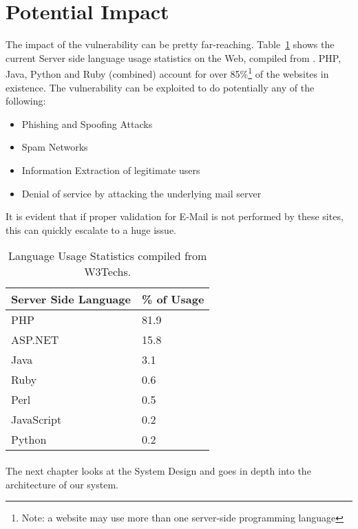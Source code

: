 \section{Potential Impact}

The impact of the vulnerability can be pretty far-reaching.
Table~\ref{tab:usage} shows the current Server side language usage statistics on the Web, compiled from \cite{W3techs}. 
PHP, Java, Python and Ruby (combined) account for over 85\%\footnote{Note: a website may use more than one server-side programming language} of the websites in existence. The vulnerability can be exploited to do potentially any of the following:
\begin{itemize}
	\item Phishing and Spoofing Attacks
	\item Spam Networks
	\item Information Extraction of legitimate users
	\item Denial of service by attacking the underlying mail server
\end{itemize}

It is evident that if proper validation for E-Mail is not performed by these sites, this can quickly escalate to a huge issue.


\begin{table}[!htbp]
	\centering
	\begin{tabular}{|p{4cm}|p{4cm}|}
		\hline
		\multicolumn{1}{|c|}{\textbf{Server Side Language}} & \multicolumn{1}{c|}{\textbf{\% of Usage}}\\
		\hline
		PHP & 81.9\\
		\hline    
		ASP.NET    & 15.8\\
		\hline
		Java & 3.1\\
		\hline
		Ruby &     0.6\\
		\hline
		Perl &    0.5\\
		\hline
		JavaScript & 0.2\\
		\hline
		Python & 0.2\\
		\hline
		
	\end{tabular}
	\caption{Language Usage Statistics compiled from W3Techs.}
	\label{tab:usage}
\end{table}

\paragraph{}
The next chapter looks at the System Design and goes in depth into the architecture of our system.
